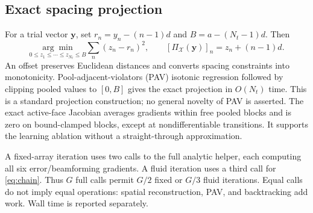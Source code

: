 \documentclass[10pt,journal,onecolumn,draftclsnofoot]{IEEEtran}
\begin{document}
\subsection{Exact spacing projection}
For a trial vector $\mathbf y$, set $r_n=y_n-(n-1)d$ and $B=a-(N_t-1)d$. Then
\begin{equation}
 \underset{0\le z_1\le\cdots\le z_{N_t}\le B}{\arg\min}
 \sum_n(z_n-r_n)^2,\qquad
 [\Pi_{\mathcal X}(\mathbf y)]_n=z_n+(n-1)d.\label{eq:pav}
\end{equation}
An offset preserves Euclidean distances and converts spacing constraints into monotonicity. Pool-adjacent-violators (PAV) isotonic regression followed by clipping pooled values to $[0,B]$ gives the exact projection in $O(N_t)$ time. This is a standard projection construction; no general novelty of PAV is asserted. The exact active-face Jacobian averages gradients within free pooled blocks and is zero on bound-clamped blocks, except at nondifferentiable transitions. It supports the learning ablation without a straight-through approximation.

A fixed-array iteration uses two calls to the full analytic helper, each computing all six error/beamforming gradients. A fluid iteration uses a third call for \eqref{eq:chain}. Thus $G$ full calls permit $G/2$ fixed or $G/3$ fluid iterations. Equal calls do not imply equal operations: spatial reconstruction, PAV, and backtracking add work. Wall time is reported separately.
\end{document}
